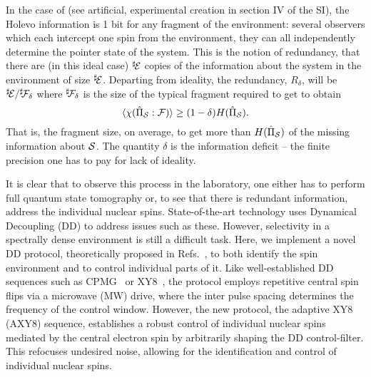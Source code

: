 \documentclass[aps,prl,floatfix,twocolumn,footinbib,superscriptaddress]{revtex4-1}
\begin{document}
In the case of  (see artificial, experimental creation in section \RN{4} of the SI), the Holevo information is 1 bit for any fragment of the environment:  several observers which each intercept one spin from the environment, they can all independently determine the pointer state of the system. This is the notion of redundancy, that there are (in this ideal case) $\Es$ copies of the information about the system in the environment of size $\Es$. Departing from ideality, the redundancy, $R_\delta$, will be $\Es/\Fd$ where $\Fd$ is the size of the typical fragment required to get to obtain
\begin{equation} \label{eq:Red}
\avg{\HolpIL} \ge (1-\delta) \HPB .
\end{equation}
That is, the fragment size, on average, to get more than $\HPB$ of the missing information about $\S$. The quantity $\delta$ is the information deficit -- the finite precision one has to pay for lack of ideality. 


It is clear that to observe this process in the laboratory, one either has to perform full quantum state tomography or, to see that there is redundant information, address the individual nuclear spins. State-of-the-art technology uses Dynamical Decoupling (DD) to address issues such as these. However, selectivity in a spectrally dense environment is still a difficult task. Here, we implement a novel DD protocol, theoretically proposed in Refs.~\cite{Cas2015,Cas17}, to both identify the spin environment and to control individual parts of it. Like well-established DD sequences such as CPMG~\cite{MAUDSLEY1986488} or XY8~\cite{gull90}, the protocol employs repetitive central spin flips via a microwave (MW) drive, where the inter pulse spacing determines the frequency of the control window. However, the new protocol, the adaptive XY8 (AXY8) sequence, establishes a robust control of individual nuclear spins mediated by the central electron spin by arbitrarily shaping the DD control-filter. This refocuses undesired noise, allowing for the identification and control of individual nuclear spins. 
\end{document}
